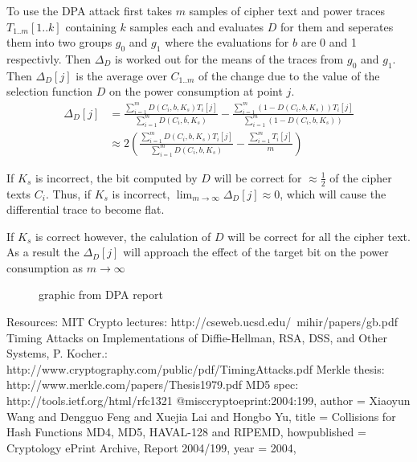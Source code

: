 \documentclass[a4paper,12pt]{article}
\begin{document}
To use the DPA attack first takes $m$ samples of cipher text and power traces $T_{1..m}[1..k]$ containing $k$ samples each and evaluates $D$ for them and seperates them into two groups $g_0$ and $g_1$ where the evaluations for $b$ are 0 and 1 respectivly. Then $\Delta_D$ is worked out for the means of the traces from $g_0$ and $g_1$. Then $\Delta_D[j]$ is the average over $C_{1..m}$ of the change due to the value of the selection function $D$ on the power consumption at point $j$. 
\begin{align}
    \Delta_D[j] &= \frac{\sum_{i=1}^mD(C_i,b,K_s)T_i[j]}{\sum_{i=1}^mD(C_i,b,K_s)} -  \frac{\sum_{i=1}^m(1-D(C_i,b,K_s))T_i[j]}{\sum_{i=1}^m(1-D(C_i,b,K_s))}\\
    &\approx 2( \frac{\sum_{i=1}^mD(C_i,b,K_s)T_i[j]}{\sum_{i=1}^mD(C_i,b,K_s)} - \frac{\sum_{i=1}^mT_i[j]}{m}) 
\end{align}

If $K_s$ is incorrect, the bit computed by $D$ will be correct for $\approx\frac{1}{2}$ of the cipher texts $C_i$. Thus, if $K_s$ is incorrect, 
$\lim_{m \rightarrow \infty} \Delta_D[j] \approx 0$, which will cause the differential trace to become flat. 

If $K_s$ is correct however, the calulation of $D$ will be correct for all the cipher text. As a result the $\Delta_D[j]$ will approach the effect of the target bit on the power consumption as $m \rightarrow \infty$

{\color{red}{TALK ABOUT DPA AGAINST HMAC-MD5}}

\begin{figure}
    {\color{red}graphic from DPA report}
    \label{fig:desRound}
\end{figure}

Resources:
MIT Crypto lectures: http://cseweb.ucsd.edu/~mihir/papers/gb.pdf
Timing Attacks on Implementations of Diffie-Hellman, RSA, DSS, and Other Systems, P. Kocher.: http://www.cryptography.com/public/pdf/TimingAttacks.pdf
Merkle thesis: http://www.merkle.com/papers/Thesis1979.pdf 
MD5 spec: http://tools.ietf.org/html/rfc1321 
@misc{cryptoeprint:2004:199,
    author = {Xiaoyun Wang  and Dengguo Feng and Xuejia Lai and Hongbo Yu},
    title = {Collisions for Hash Functions MD4, MD5, HAVAL-128 and RIPEMD},
    howpublished = {Cryptology ePrint Archive, Report 2004/199},
    year = {2004},
}
\end{document}
